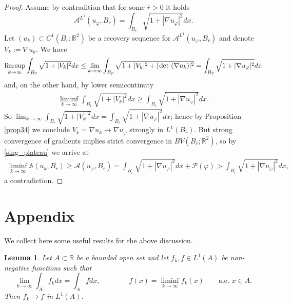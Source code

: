\documentclass[a4paper,11pt]{article}
\numberwithin{equation}{section}
\newtheorem{lemma}[theorem]{Lemma}
\def\det{\,{\rm det\ }}
\newcommand{\R}{\mathbb{R}}
\begin{document}
 \begin{proof}
Assume by contradition that for some $\overline r>0$ it holds
$$\mathcal A^{L^1}(u_\varphi,B_{\overline r})=\int_{B_{\overline r}} \sqrt{1+|\nabla u_\varphi|^2}dx.$$
Let $(u_k)\subset C^1(B_{\overline r};\R^2)$ be a recovery sequence for $\mathcal A^{L^1}(u_\varphi,B_{\overline r})$ and denote $V_k:=\nabla u_k$. We have
\begin{align*}
\limsup_{k\rightarrow \infty}\int_{B_{\overline r}}\sqrt{1+|V_k|^2}dx\leq \lim_{k\rightarrow \infty}\int_{B_{\overline r}}\sqrt{1+|V_k|^2+|\det(\nabla u_k)|^2}=\int_{B_{\overline r}} \sqrt{1+|\nabla u_\varphi|^2}dx
\end{align*}
and, on the other hand, by lower semicontinuty 
\begin{align*}
\liminf_{k\rightarrow \infty}\int_{B_{\overline r}}\sqrt{1+|V_k|^2}dx\geq \int_{B_{\overline r}} \sqrt{1+|\nabla u_\varphi|^2}dx.
\end{align*}
So $\lim_{k\rightarrow \infty}\int_{B_{\overline r}}\sqrt{1+|V_k|^2}dx= \int_{B_{\overline r}} \sqrt{1+|\nabla u_\varphi|^2}dx$; hence by Proposition \ref{prop34} we conclude
$V_k=\nabla u_k\rightarrow \nabla u_\varphi$ strongly in $L^1(B_{\overline r})$. But strong convergence of gradients implies strict convergence in $BV(B_{\overline r};\R^2)$, so by \eqref{sing_plateau} we arrive at
\begin{align*}
\liminf_{k\rightarrow \infty}\mathbb A(u_k,B_{\overline r})\geq \mathcal A(u_\varphi,B_{\overline r}
)=\int_{B_{\overline r}} \sqrt{1+|\nabla u_\varphi|^2}dx+\mathcal P(\varphi)>\int_{B_{\overline r}} \sqrt{1+|\nabla u_\varphi|^2}dx,
\end{align*}
 a contradiction.
\end{proof} 

\section{Appendix}
We collect here some useful results for the above discussion.
\begin{lemma}\label{Fatou=}
	Let $A\subset\R$ be a bounded open set and let $f_k,f\in L^1(A)$ be non-negative functions such that
	$$\lim_{k\rightarrow \infty}\int_Af_kdx=\int_Afdx,\qquad \qquad f(x)=\liminf_{k\rightarrow \infty}f_k(x)\qquad \text{a.e. }x\in A.$$
	 Then $f_k\rightarrow f$ in $L^1(A)$.	
\end{lemma}
\end{document}
